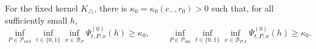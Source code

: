 For the fixed kernel \(K_\triangle\), there is \(\kappa_0=\kappa_0(c_{-},r_0)>0\) such that, for all sufficiently small \(h\), \[\inf_{P\in\mathcal{P}_{\mathrm{rect}}}\inf_{t\in\{0,1\}}\inf_{x\in\mathcal{B}_P}\Psi^{(0)}_{t,P,x}(h)\geq\kappa_0,\qquad \inf_{P\in\mathcal{P}_{\mathrm{sm}}}\inf_{t\in\{0,1\}}\inf_{x\in\mathcal{B}_{P,\delta}}\Psi^{(0)}_{t,P,x}(h)\geq\kappa_0.\]